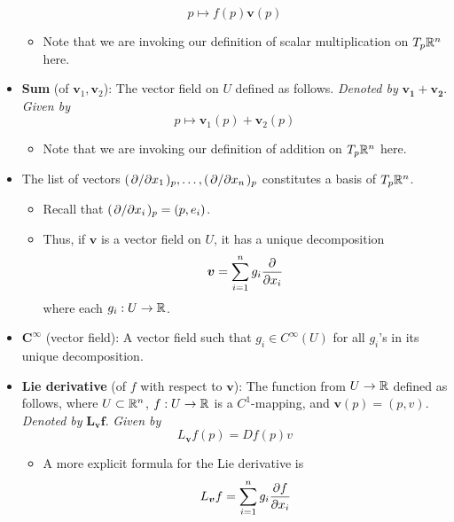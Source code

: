 \documentclass[../notes.tex]{subfiles}
\begin{document}
\begin{itemize}
    \begin{equation*}
        p \mapsto f(p)\bm{v}(p)
    \end{equation*}
    \begin{itemize}
        \item Note that we are invoking our definition of scalar multiplication on $T_p\mathbb{R}^n$ here.
    \end{itemize}
    \item \textbf{Sum} (of $\bm{v}_1,\bm{v}_2$): The vector field on $U$ defined as follows. \emph{Denoted by} $\bm{\pmb{v}_1+\pmb{v}_2}$. \emph{Given by}
    \begin{equation*}
        p \mapsto \bm{v}_1(p)+\bm{v}_2(p)
    \end{equation*}
    \begin{itemize}
        \item Note that we are invoking our definition of addition on $T_p\mathbb{R}^n$ here.
    \end{itemize}
    \item The list of vectors $(\pdv*{x_1})_p,\dots,(\pdv*{x_n})_p$ constitutes a basis of $T_p\mathbb{R}^n$.
    \begin{itemize}
        \item Recall that $(\pdv*{x_i})_p=(p,e_i)$.
        \item Thus, if $\bm{v}$ is a vector field on $U$, it has a unique decomposition
        \begin{equation*}
            \bm{v} = \sum_{i=1}^ng_i\pdv{x_i}
        \end{equation*}
        where each $g_i:U\to\mathbb{R}$.
    \end{itemize}
    \item $\bm{C^\infty}$ (vector field): A vector field such that $g_i\in C^\infty(U)$ for all $g_i$'s in its unique decomposition.
    \item \textbf{Lie derivative} (of $f$ with respect to $\bm{v}$): The function from $U\to\mathbb{R}$ defined as follows, where $U\subset\mathbb{R}^n$, $f:U\to\mathbb{R}$ is a $C^1$-mapping, and $\bm{v}(p)=(p,v)$. \emph{Denoted by} $\bm{L_{\pmb{v}}f}$. \emph{Given by}
    \begin{equation*}
        L_{\bm{v}}f(p) = Df(p)v
    \end{equation*}
    \begin{itemize}
        \item A more explicit formula for the Lie derivative is
        \begin{equation*}
            L_{\bm{v}}f = \sum_{i=1}^ng_i\pdv{f}{x_i}

\end{equation*}
\end{itemize}
\end{itemize}
\end{document}
